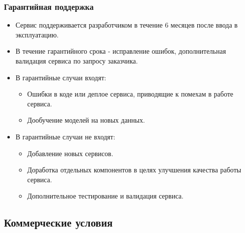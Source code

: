 \documentclass[12pt]{article}
\begin{document}
\subsubsection{Гарантийная поддержка}
\begin{itemize}
	\item Сервис поддерживается разработчиком в течение 6 месяцев после ввода в эксплуатацию.
	\item В течение гарантийного срока - исправление ошибок, дополнительная валидация сервиса по запросу заказчика.
	\item В гарантийные случаи входят:
	      \begin{itemize}
		      \item Ошибки в коде или деплое сервиса, приводящие к помехам в работе сервиса.
		      \item Дообучение моделей на новых данных.
	      \end{itemize}
	\item В гарантийные случаи не входят:
	      \begin{itemize}
		      \item Добавление новых сервисов.
		      \item Доработка отдельных компонентов в целях улучшения качества работы сервиса.
		      \item Дополнительное тестирование и валидация сервиса.
	      \end{itemize}
\end{itemize}

\subsection{Коммерческие условия}
\end{document}
